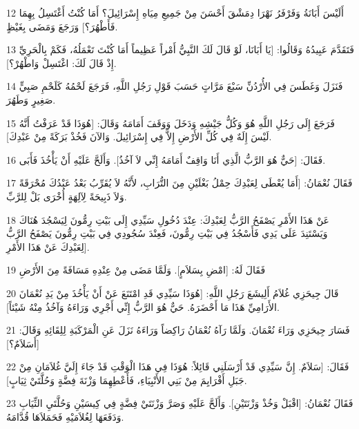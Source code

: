 \par 12 أَلَيْسَ أَبَانَةُ وَفَرْفَرُ نَهْرَا دِمَشْقَ أَحْسَنَ مِنْ جَمِيعِ مِيَاهِ إِسْرَائِيلَ؟ أَمَا كُنْتُ أَغْتَسِلُ بِهِمَا فَأَطْهُرَ؟] وَرَجَعَ وَمَضَى بِغَيْظٍ.
\par 13 فَتَقَدَّمَ عَبِيدُهُ وَقَالُوا: [يَا أَبَانَا، لَوْ قَالَ لَكَ النَّبِيُّ أَمْراً عَظِيماً أَمَا كُنْتَ تَعْمَلُهُ، فَكَمْ بِالْحَرِيِّ إِذْ قَالَ لَكَ: اغْتَسِلْ وَاطْهُرْ؟].
\par 14 فَنَزَلَ وَغَطَسَ فِي الأُرْدُنِّ سَبْعَ مَرَّاتٍ حَسَبَ قَوْلِ رَجُلِ اللَّهِ، فَرَجَعَ لَحْمُهُ كَلَحْمِ صَبِيٍّ صَغِيرٍ وَطَهُرَ.
\par 15 فَرَجَعَ إِلَى رَجُلِ اللَّهِ هُوَ وَكُلُّ جَيْشِهِ وَدَخَلَ وَوَقَفَ أَمَامَهُ وَقَالَ: [هُوَذَا قَدْ عَرَفْتُ أَنَّهُ لَيْسَ إِلَهٌ فِي كُلِّ الأَرْضِ إِلاَّ فِي إِسْرَائِيلَ. وَالآنَ فَخُذْ بَرَكَةً مِنْ عَبْدِكَ].
\par 16 فَقَالَ: [حَيٌّ هُوَ الرَّبُّ الَّذِي أَنَا وَاقِفٌ أَمَامَهُ إِنِّي لاَ آخُذُ]. وَأَلَحَّ عَلَيْهِ أَنْ يَأْخُذَ فَأَبَى.
\par 17 فَقَالَ نُعْمَانُ: [أَمَا يُعْطَى لِعَبْدِكَ حِمْلُ بَغْلَيْنِ مِنَ التُّرَابِ، لأَنَّهُ لاَ يُقَرِّبُ بَعْدُ عَبْدُكَ مُحْرَقَةً وَلاَ ذَبِيحَةً لِآلِهَةٍ أُخْرَى بَلْ لِلرَّبِّ.
\par 18 عَنْ هَذَا الأَمْرِ يَصْفَحُ الرَّبُّ لِعَبْدِكَ: عِنْدَ دُخُولِ سَيِّدِي إِلَى بَيْتِ رِمُّونَ لِيَسْجُدَ هُنَاكَ وَيَسْتَنِدَ عَلَى يَدِي فَأَسْجُدُ فِي بَيْتِ رِمُّونَ، فَعِنْدَ سُجُودِي فِي بَيْتِ رِمُّونَ يَصْفَحُ الرَّبُّ لِعَبْدِكَ عَنْ هَذَا الأَمْرِ].
\par 19 فَقَالَ لَهُ: [امْضِ بِسَلاَمٍ]. وَلَمَّا مَضَى مِنْ عِنْدِهِ مَسَافَةً مِنَ الأَرْضِ
\par 20 قَالَ جِيحَزِي غُلاَمُ أَلِيشَعَ رَجُلِ اللَّهِ: [هُوَذَا سَيِّدِي قَدِ امْتَنَعَ عَنْ أَنْ يَأْخُذَ مِنْ يَدِ نُعْمَانَ الأَرَامِيِّ هَذَا مَا أَحْضَرَهُ. حَيٌّ هُوَ الرَّبُّ إِنِّي أَجْرِي وَرَاءَهُ وَآخُذُ مِنْهُ شَيْئاً].
\par 21 فَسَارَ جِيحَزِي وَرَاءَ نُعْمَانَ. وَلَمَّا رَآهُ نُعْمَانُ رَاكِضاً وَرَاءَهُ نَزَلَ عَنِ الْمَرْكَبَةِ لِلِقَائِهِ وَقَالَ: [أَسَلاَمٌ؟]
\par 22 فَقَالَ: [سَلاَمٌ. إِنَّ سَيِّدِي قَدْ أَرْسَلَنِي قَائِلاً: هُوَذَا فِي هَذَا الْوَقْتِ قَدْ جَاءَ إِلَيَّ غُلاَمَانِ مِنْ جَبَلِ أَفْرَايِمَ مِنْ بَنِي الأَنْبِيَاءِ، فَأَعْطِهِمَا وَزْنَةَ فِضَّةٍ وَحُلَّتَيْ ثِيَابٍ].
\par 23 فَقَالَ نُعْمَانُ: [اقْبَلْ وَخُذْ وَزْنَتَيْنِ]. وَأَلَحَّ عَلَيْهِ وَصَرَّ وَزْنَتَيْ فِضَّةٍ فِي كِيسَيْنِ وَحُلَّتَيِ الثِّيَابِ وَدَفَعَهَا لِغُلاَمَيْهِ فَحَمَلاَهَا قُدَّامَهُ.
